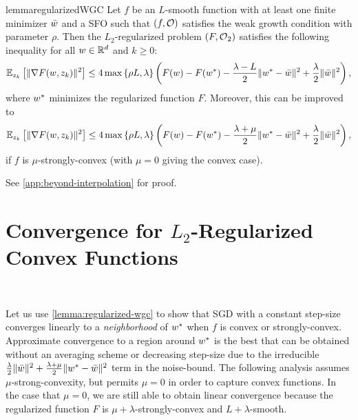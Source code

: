 \begin{restatable}{lemma}{regularizedWGC}\label{lemma:regularized-wgc}
    Let \( f \) be an \( L \)-smooth function with at least one finite minimizer \( \wbar \) and \oracle{} a \ac{SFO} such that \( \rbr{f, \oracle{}} \) satisfies the weak growth condition with parameter \( \rho \).
    Then the \( L_2 \)-regularized problem \( \rbr{F, \oracle{}_2} \) satisfies the following inequality for all \( \w \in \R^d \) and \( k \geq 0 \):
    \[ \Ek\sbr{\norm{\nabla F(\w, \zk)}^2} \leq 4 \max\cbr{\rho L, \lambda} \rbr{F(\w) - F(\wopt) - \frac{\lambda - L}{2} \norm{\wopt - \wbar}^2 + \frac{\lambda}{2} \norm{\wbar}^2}, \]
    where \( \wopt \) minimizes the regularized function \( F \).
    Moreover, this can be improved to 
    \[ \Ek\sbr{\norm{\nabla F(\w, \zk)}^2} \leq 4 \max\cbr{\rho L, \lambda} \rbr{F(\w) - F(\wopt) - \frac{\lambda + \mu}{2} \norm{\wopt - \wbar}^2 + \frac{\lambda}{2} \norm{\wbar}^2}, \]
    if \( f \) is \( \mu \)-strongly-convex (with \( \mu = 0 \) giving the convex case).
\end{restatable}
\noindent See \autoref{app:beyond-interpolation} for proof.

\section{Convergence for \( L_2 \)-Regularized Convex Functions}~\label{sec:regularized-convex}

Let us use \autoref{lemma:regularized-wgc} to show that \ac{SGD} with a constant step-size converges linearly to a \emph{neighborhood} of \( \wopt \) when \( f \) is convex or strongly-convex.
Approximate convergence to a region around \( \wopt \) is the best that can be obtained without an averaging scheme or decreasing step-size due to the irreducible \( \frac{\lambda}{2} \norm{\wbar}^2 + \frac{\lambda + \mu}{2} \norm{\wopt - \wbar}^2 \) term in the noise-bound.
The following analysis assumes \( \mu \)-strong-convexity, but permits \( \mu = 0 \) in order to capture convex functions.
In the case that \( \mu = 0 \), we are still able to obtain linear convergence because the regularized function \( F \) is \( \mu + \lambda \)-strongly-convex and \( L + \lambda \)-smooth. 


